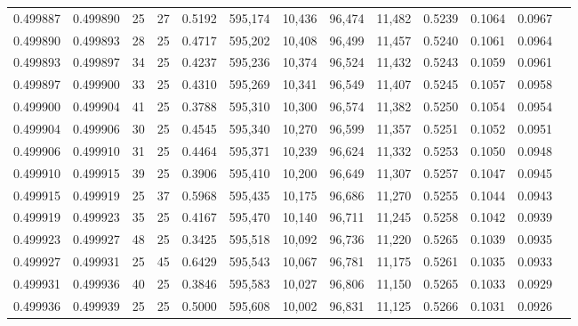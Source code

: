 \begin{tabular}{rrrrrrrrrrrrr}
0.499887 & 0.499890 &    25 &  27 &                                     0.5192 & 595,174 &  10,436 &  96,474 &  11,482 & 0.5239 & 0.1064 & 0.0967 \\
0.499890 & 0.499893 &    28 &  25 &                                     0.4717 & 595,202 &  10,408 &  96,499 &  11,457 & 0.5240 & 0.1061 & 0.0964 \\
0.499893 & 0.499897 &    34 &  25 &                                     0.4237 & 595,236 &  10,374 &  96,524 &  11,432 & 0.5243 & 0.1059 & 0.0961 \\
0.499897 & 0.499900 &    33 &  25 &                                     0.4310 & 595,269 &  10,341 &  96,549 &  11,407 & 0.5245 & 0.1057 & 0.0958 \\
0.499900 & 0.499904 &    41 &  25 &                                     0.3788 & 595,310 &  10,300 &  96,574 &  11,382 & 0.5250 & 0.1054 & 0.0954 \\
0.499904 & 0.499906 &    30 &  25 &                                     0.4545 & 595,340 &  10,270 &  96,599 &  11,357 & 0.5251 & 0.1052 & 0.0951 \\
0.499906 & 0.499910 &    31 &  25 &                                     0.4464 & 595,371 &  10,239 &  96,624 &  11,332 & 0.5253 & 0.1050 & 0.0948 \\
0.499910 & 0.499915 &    39 &  25 &                                     0.3906 & 595,410 &  10,200 &  96,649 &  11,307 & 0.5257 & 0.1047 & 0.0945 \\
0.499915 & 0.499919 &    25 &  37 &                                     0.5968 & 595,435 &  10,175 &  96,686 &  11,270 & 0.5255 & 0.1044 & 0.0943 \\
0.499919 & 0.499923 &    35 &  25 &                                     0.4167 & 595,470 &  10,140 &  96,711 &  11,245 & 0.5258 & 0.1042 & 0.0939 \\
0.499923 & 0.499927 &    48 &  25 &                                     0.3425 & 595,518 &  10,092 &  96,736 &  11,220 & 0.5265 & 0.1039 & 0.0935 \\
0.499927 & 0.499931 &    25 &  45 &                                     0.6429 & 595,543 &  10,067 &  96,781 &  11,175 & 0.5261 & 0.1035 & 0.0933 \\
0.499931 & 0.499936 &    40 &  25 &                                     0.3846 & 595,583 &  10,027 &  96,806 &  11,150 & 0.5265 & 0.1033 & 0.0929 \\
0.499936 & 0.499939 &    25 &  25 &                                     0.5000 & 595,608 &  10,002 &  96,831 &  11,125 & 0.5266 & 0.1031 & 0.0926 \\

\end{tabular}
